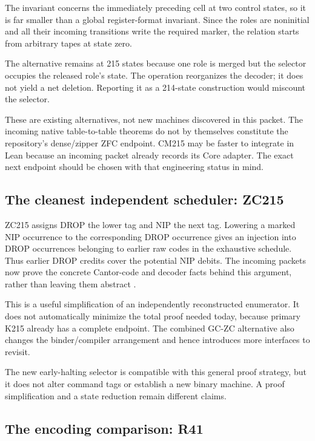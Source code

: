 \documentclass[11pt]{article}
\theoremstyle{remark}
\begin{document}
The invariant concerns the immediately preceding cell at two control
states, so it is far smaller than a global register-format invariant.
Since the roles are noninitial and all their incoming transitions write
the required marker, the relation starts from arbitrary tapes at state zero.

The alternative remains at 215 states because one role is merged but
the selector occupies the released role's state. The operation reorganizes
the decoder; it does not yield a net deletion. Reporting it as a 214-state
construction would miscount the selector.

These are existing alternatives, not new machines discovered in this
packet. The incoming native table-to-table theorems do not by themselves
constitute the repository's dense/zipper ZFC endpoint. CM215 may be faster
to integrate in Lean because an incoming packet already records its Core
adapter. The exact next endpoint should be chosen with that engineering
status in mind.

\subsection{The cleanest independent scheduler: ZC215}

ZC215 assigns DROP the lower tag and NIP the next tag. Lowering a marked
NIP occurrence to the corresponding DROP occurrence gives an injection into DROP occurrences belonging to earlier raw
codes in the exhaustive schedule. Thus earlier DROP
credits cover the potential NIP debits. The incoming packets now prove
the concrete Cantor-code and decoder facts behind this argument, rather
than leaving them abstract \cite{checked,refinements}.

This is a useful simplification of an independently reconstructed
enumerator. It does not automatically minimize the total proof needed
today, because primary K215 already has a complete endpoint. The combined
GC-ZC alternative also changes the binder/compiler arrangement and hence
introduces more interfaces to revisit.

The new early-halting selector is compatible with this general proof
strategy, but it does not alter command tags or establish a new binary
machine. A proof simplification and a state reduction remain different
claims.

\subsection{The encoding comparison: R41}
\end{document}
